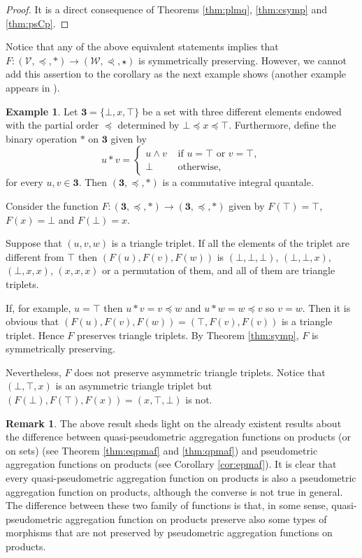 \documentclass[11pt,a4paper]{amsart}
\theoremstyle{definition}
\newtheorem{example}[theorem]{Example}
\newtheorem{remark}[theorem]{Remark}
\begin{document}
	\begin{proof}
		It is a direct consequence of Theorems \ref{thm:plmq}, \ref{thm:csymp} and \ref{thm:psCp}.
	\end{proof}
	
	Notice that any of the above equivalent statements implies that $F:(\mathscr{V},\preceq,\ast)\to(\mathscr{W},\curlyeqprec,\star)$ is symmetrically preserving. However, we cannot add this assertion to the corollary as the next example shows (another example a\-ppears in \cite[Proposition 2.9]{Corazza99}).
	
	\begin{example}
		Let $\mathbf{3}=\{\bot,x,\top\}$ be a set with three different elements endowed with the partial order $\preceq$ determined by $\bot\preceq x\preceq \top.$ Furthermore, define the binary operation $\ast$ on $\mathbf{3}$ given by 
		$$u\ast v=\begin{cases}
			u\wedge v&\text{ if }u=\top\text{ or }v=\top,\\
			\bot&\text{ otherwise},
		\end{cases}$$
		for every $u,v\in\mathbf{3}.$ Then $(\mathbf{3},\preceq,\ast)$ is a commutative integral quantale. 
		
		Consider the function $F:(\mathbf{3},\preceq,\ast)\to (\mathbf{3},\preceq,\ast)$
		given by $F(\top)=\top$, $F(x)=\bot$ and $F(\bot)=x.$
		
		Suppose that $(u,v,w)$ is a triangle triplet. If all the elements of the triplet are different from $\top$ then $(F(u),F(v),F(w))$ is $(\bot,\bot,\bot)$, $(\bot,\bot,x)$, $(\bot,x,x)$, $(x,x,x)$  or a permutation of them, and all of them are triangle triplets. 
		
		If, for example, $u=\top$ then $u\ast v=v\preceq w$ and $u\ast w=w\preceq v$ so $v=w.$ Then it is obvious that  $(F(u),F(v),F(w))=(\top,F(v),F(v))$ is a triangle triplet. Hence $F$ preserves triangle triplets. By Theorem \ref{thm:symp}, $F$ is symmetrically preserving.
		
		Nevertheless, $F$ does not preserve asymmetric triangle triplets. Notice that $(\bot,\top,x)$ is an asymmetric triangle triplet but $(F(\bot),F(\top),F(x))=(x,\top,\bot)$ is not.
		
	\end{example}


	
	\begin{remark}\label{rem:diff}
		The above result sheds light on the already existent results about the difference between quasi-pseudometric aggregation functions on products (or on sets) (see Theorem \ref{thm:eqpmaf} and \ref{thm:qpmaf}) and pseudometric aggregation functions on products (see Corollary \ref{cor:epmaf}). It is clear that every quasi-pseudometric aggregation function on products is also a pseudometric aggregation function on products, although the converse is not true in general. The difference between these two family of functions is that, in some sense, quasi-pseudometric aggregation function on products preserve also some types of morphisms that are not preserved by pseudometric aggregation functions on products.
	\end{remark}
	
\end{document}
